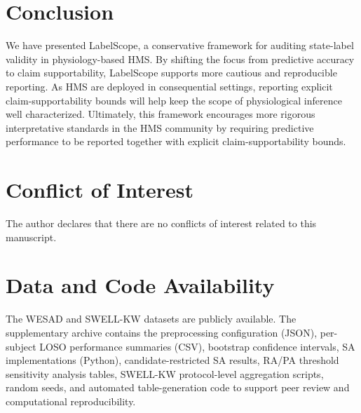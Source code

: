 \documentclass[journal]{IEEEtran}
\begin{document}
\section{Conclusion}
We have presented LabelScope, a conservative framework for auditing state-label validity in physiology-based HMS. By shifting the focus from predictive accuracy to claim supportability, LabelScope supports more cautious and reproducible reporting. As HMS are deployed in consequential settings, reporting explicit claim-supportability bounds will help keep the scope of physiological inference well characterized. Ultimately, this framework encourages more rigorous interpretative standards in the HMS community by requiring predictive performance to be reported together with explicit claim-supportability bounds.

\section*{Conflict of Interest}
The author declares that there are no conflicts of interest related to this manuscript.

\section*{Data and Code Availability}
The WESAD and SWELL-KW datasets are publicly available. The supplementary archive contains the preprocessing configuration (JSON), per-subject LOSO performance summaries (CSV), bootstrap confidence intervals, SA implementations (Python), candidate-restricted SA results, RA/PA threshold sensitivity analysis tables, SWELL-KW protocol-level aggregation scripts, random seeds, and automated table-generation code to support peer review and computational reproducibility.
\end{document}
